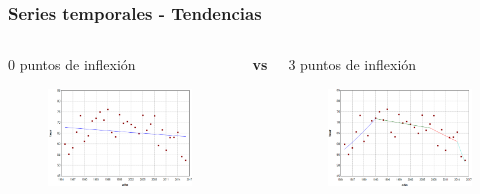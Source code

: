 \documentclass{beamer}
\begin{document}
\begin{frame}\frametitle{Series temporales - Tendencias}
	\begin{columns}
		\begin{column}{0.5\textwidth}
			\centering \normalsize 0 puntos de inflexión
			\begin{figure}
				\includegraphics[width=\textwidth]{images/jpo0.png}
			\end{figure}
			
		\end{column}
		\large{\textbf{vs}}
		\begin{column}{0.5\textwidth}
			\centering \normalsize 3 puntos de inflexión
			\begin{figure}
				\centering
				\includegraphics[width=\textwidth]{images/jpo3.png}
			\end{figure}
		\end{column}
	\end{columns}


\end{frame}
\end{document}
